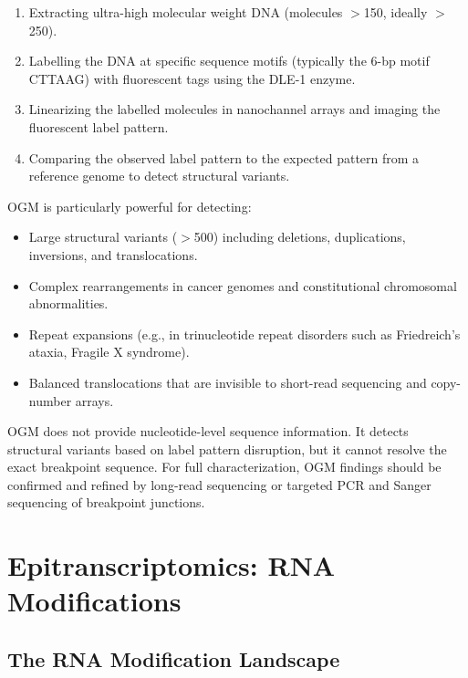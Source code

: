 \begin{enumerate}[itemsep=2pt]
  \item Extracting ultra-high molecular weight DNA (molecules $>$150\kilobase{}, ideally $>$250\kilobase{}).
  \item Labelling the DNA at specific sequence motifs (typically the 6-bp motif CTTAAG) with fluorescent tags using the DLE-1 enzyme.
  \item Linearizing the labelled molecules in nanochannel arrays and imaging the fluorescent label pattern.
  \item Comparing the observed label pattern to the expected pattern from a reference genome to detect structural variants.
\end{enumerate}

OGM is particularly powerful for detecting:
\begin{itemize}[itemsep=2pt]
  \item Large structural variants ($>$500\basepair{}) including deletions, duplications, inversions, and translocations.
  \item Complex rearrangements in cancer genomes and constitutional chromosomal abnormalities.
  \item Repeat expansions (e.g., in trinucleotide repeat disorders such as Friedreich's ataxia, Fragile X syndrome).
  \item Balanced translocations that are invisible to short-read sequencing and copy-number arrays.
\end{itemize}

\begin{warningbox}
OGM does not provide nucleotide-level sequence information. It detects structural variants based on label pattern disruption, but it cannot resolve the exact breakpoint sequence. For full characterization, OGM findings should be confirmed and refined by long-read sequencing or targeted PCR and Sanger sequencing of breakpoint junctions.
\end{warningbox}


\section{Epitranscriptomics: RNA Modifications}
\label{sec:specialized:epitranscriptomics}

\subsection{The RNA Modification Landscape}
\label{subsec:specialized:rna-mods}

